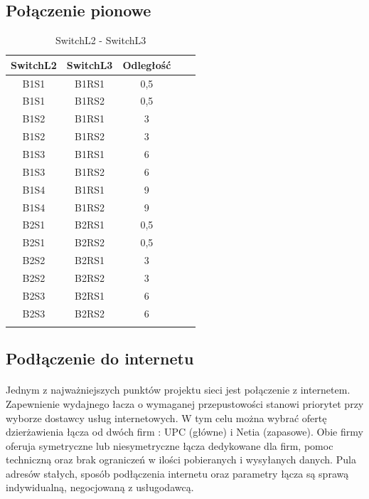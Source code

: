 \subsection{Połączenie pionowe}
\begin{center}
    \begin{longtable}{|c|c|c|c|c|}
    \hline
 	SwitchL2 & SwitchL3 & Odległość \\ \hline
 	B1S1 & B1RS1 & 0,5 \\ \hline
 	B1S1 & B1RS2 & 0,5 \\ \hline
 	B1S2 & B1RS1 & 3 \\ \hline
 	B1S2 & B1RS2 & 3 \\ \hline
 	B1S3 & B1RS1 & 6 \\ \hline
 	B1S3 & B1RS2 & 6 \\ \hline
 	B1S4 & B1RS1 & 9 \\ \hline
 	B1S4 & B1RS2 & 9 \\ \hline
 	B2S1 & B2RS1 & 0,5 \\ \hline
 	B2S1 & B2RS2 & 0,5 \\ \hline 
	B2S2 & B2RS1 & 3 \\ \hline
 	B2S2 & B2RS2 & 3 \\ \hline
 	B2S3 & B2RS1 & 6 \\ \hline
 	B2S3 & B2RS2 & 6 \\ \hline
 	
	\caption{SwitchL2 - SwitchL3}\\
\end{longtable}
\end{center}


\subsection{Podłączenie do internetu}
\paragraph{}
Jednym z najważniejszych punktów projektu sieci jest połączenie z internetem. Zapewnienie wydajnego łacza o wymaganej przepustowości stanowi priorytet przy wyborze dostawcy usług internetowych. W tym celu można wybrać ofertę dzierżawienia łącza od dwóch firm : UPC (główne) i Netia (zapasowe). Obie firmy oferuja symetryczne lub niesymetryczne łącza dedykowane dla firm, pomoc techniczną oraz brak ograniczeń w ilości pobieranych i wysyłanych danych. Pula adresów stałych, sposób podłączenia internetu oraz parametry łącza są sprawą indywidualną, negocjowaną z usługodawcą.

